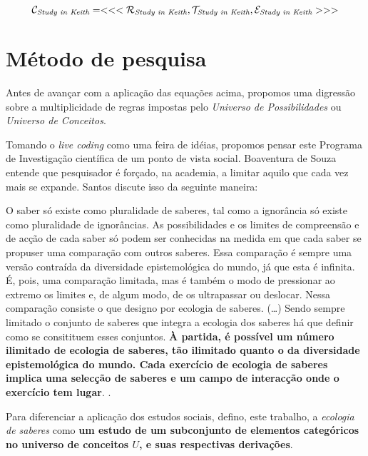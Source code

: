 \begin{equation}
\mathcal{C}_\emph{Study in Keith} = <<<\mathcal{R}_\emph{Study in Keith}, \mathcal{T}_\emph{Study in Keith},  \mathcal{E}_\emph{Study in Keith} >>> 
\end{equation}\label{eq:keith}

\section{Método de pesquisa}\label{conjunto_conhecimentos}

Antes de avançar com a aplicação das equações acima, propomos uma digressão sobre a multiplicidade de regras impostas pelo \emph{Universo de Possibilidades} ou \emph{Universo de Conceitos}.

Tomando o \emph{live coding} como uma feira de idéias, propomos pensar este Programa de Investigação científica de um ponto de vista social. Boaventura de Souza  entende  que pesquisador é forçado, na academia, a limitar aquilo que cada vez mais se expande. Santos discute isso da seguinte maneira:

\begin{citacao}
O saber só existe como pluralidade de saberes, tal como a ignorância só existe como pluralidade de ignorâncias. As possibilidades e os limites de compreensão e de acção de cada saber só podem ser conhecidas na medida em que cada saber se propuser uma comparação com outros saberes. Essa comparação é sempre uma versão contraída da diversidade epistemológica do mundo, já que esta é infinita. É, pois, uma comparação limitada, mas é também o modo de pressionar ao extremo os limites e, de algum modo, de os ultrapassar ou deslocar. Nessa comparação consiste o que designo por ecologia de saberes. (\ldots) Sendo sempre limitado o conjunto de saberes que integra a ecologia dos saberes há que definir como se consitituem esses conjuntos. \textbf{À partida, é possível um número ilimitado de ecologia de saberes, tão ilimitado quanto o da diversidade epistemológica do mundo. Cada exercício de ecologia de saberes implica uma selecção de saberes e um campo de interacção onde o exercício tem lugar}. \cite[p.~28-30]{santos_filosofia_2008}.
\end{citacao}


Para diferenciar a aplicação dos estudos sociais, defino, este trabalho, a \emph{ecologia de saberes} como \textbf{um estudo de um subconjunto de elementos categóricos no universo de conceitos $U$, e suas respectivas derivações}.

